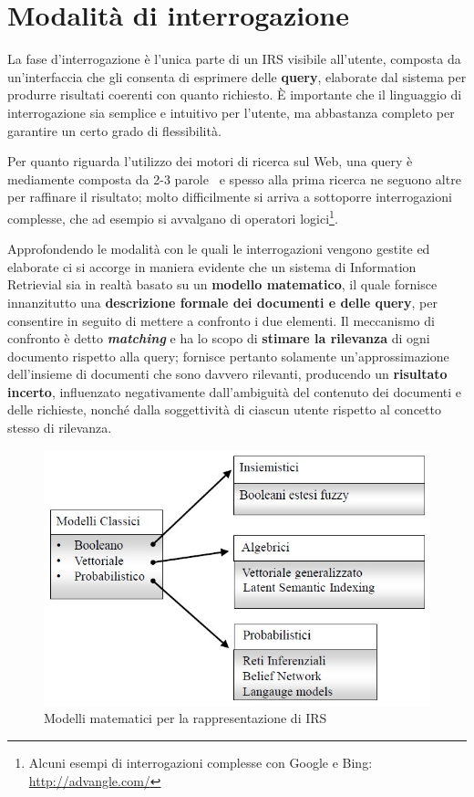 \section{Modalità di interrogazione}
\label{sec:mathmodels}

La fase d’interrogazione è l’unica parte di un IRS visibile all’utente, composta da un’interfaccia che gli consenta di esprimere delle \textbf{query}, elaborate dal sistema per produrre risultati coerenti con quanto richiesto. È importante che il linguaggio di interrogazione sia semplice e intuitivo per l’utente, ma abbastanza completo per garantire un certo grado di flessibilità.

Per quanto riguarda l’utilizzo dei motori di ricerca sul Web, una query è mediamente composta da 2-3 parole~\cite{datigoogle} e spesso alla prima ricerca ne seguono altre per raffinare il risultato; molto difficilmente si arriva a sottoporre interrogazioni complesse, che ad esempio si avvalgano di operatori logici\footnote{Alcuni esempi di interrogazioni complesse con Google e Bing:  \url{http://advangle.com/}}.

Approfondendo le modalità con le quali le interrogazioni vengono gestite ed elaborate ci si accorge in maniera evidente che un sistema di Information Retrievial sia in realtà basato su un \textbf{modello matematico}, il quale fornisce innanzitutto una \textbf{descrizione formale dei documenti e delle query}, per consentire in seguito di mettere a confronto i due elementi. Il meccanismo di confronto è detto \textbf{\textit{matching}} e ha lo scopo di \textbf{stimare la rilevanza} di ogni documento rispetto alla query; fornisce pertanto solamente un’approssimazione dell’insieme di documenti che sono davvero rilevanti, producendo un \textbf{risultato incerto}, influenzato negativamente dall’ambiguità del contenuto dei documenti e delle richieste, nonché dalla soggettività di ciascun utente rispetto al concetto stesso di rilevanza.

\begin{figure}[H]
	\centering
	\includegraphics[scale=0.5]{../images/01_4_modelli_matching}
	\caption[Modelli matematici per la rappresentazione di IRS]{Modelli matematici per la rappresentazione di IRS}
	\label{fig:mathmodels}
\end{figure}

